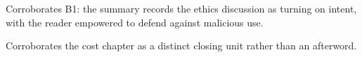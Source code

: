 

\begin{distilled}
  \item Corroborates B1: the summary records the ethics discussion as turning on intent, with the reader empowered to defend against malicious use.
  \item Corroborates the cost chapter as a distinct closing unit rather than an afterword.
\end{distilled}
